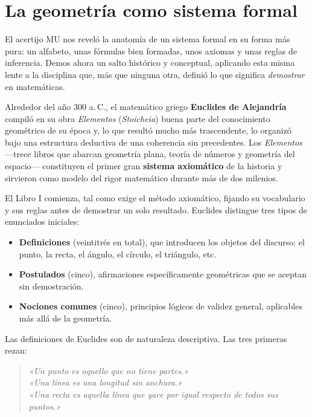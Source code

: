 \section{La geometría como sistema formal}

El acertijo MU nos reveló la anatomía de un sistema formal en su forma más pura: un alfabeto, unas fórmulas bien
formadas, unos axiomas y unas reglas de inferencia. Demos ahora un salto histórico y conceptual, aplicando esta misma
lente a la disciplina que, más que ninguna otra, definió lo que significa \emph{demostrar} en matemáticas.

Alrededor del año 300 a.\,C., el matemático griego \textbf{Euclides de Alejandría} compiló en su obra
\emph{Elementos} (\emph{Stoicheia}) buena parte del conocimiento geométrico de su época y,
lo que resultó mucho más trascendente, lo organizó bajo una estructura deductiva de una coherencia sin precedentes. Los
\emph{Elementos} —trece libros que abarcan geometría plana, teoría de números y geometría del espacio— constituyen el
primer gran \textbf{sistema axiomático} de la historia y sirvieron como modelo del rigor
matemático durante más de dos milenios.

El Libro I comienza, tal como exige el método axiomático, fijando su vocabulario y sus reglas antes de demostrar un
solo resultado. Euclides distingue tres tipos de enunciados iniciales:

\begin{itemize}
    \item \textbf{Definiciones} (veintitrés en total), que introducen los objetos del discurso: el punto, la recta, el
          ángulo, el círculo, el triángulo, etc.
    \item \textbf{Postulados} (cinco), afirmaciones específicamente geométricas que se aceptan sin demostración.
    \item \textbf{Nociones comunes} (cinco), principios lógicos de validez general, aplicables más allá de la geometría.
\end{itemize}

Las definiciones de Euclides son de naturaleza descriptiva. Las tres primeras rezan:

\begin{quote}
    \emph{«Un punto es aquello que no tiene partes.»} \\
    \emph{«Una línea es una longitud sin anchura.»} \\
    \emph{«Una recta es aquella línea que yace por igual respecto de todos sus puntos.»}
\end{quote}

